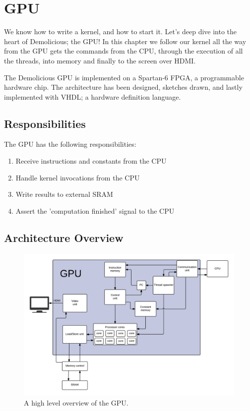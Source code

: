 \documentclass[../main/report.tex]{subfiles}
\begin{document}
\chapter{GPU}

We know how to write a kernel, and how to start it.
Let's deep dive into the heart of Demolicious; the GPU!
In this chapter we follow our kernel all the way from the GPU gets the commands from the CPU,
through the execution of all the threads, into memory and finally to the screen over HDMI.

The Demolicious GPU is implemented on a Spartan-6 FPGA, a programmable hardware chip.
The architecture has been designed, sketches drawn, and lastly implemented with VHDL;
a hardware definition language.

\section{Responsibilities}

The GPU has the following responsibilities:
\begin{enumerate}
  \item
    Receive instructions and constants from the CPU
  \item
    Handle kernel invocations from the CPU
  \item
    Write results to external SRAM
  \item
    Assert the 'computation finished' signal to the CPU
\end{enumerate}

\section{Architecture Overview}
\begin{figure}[H]
\centering
\includegraphics[width=\textwidth]{../gpu/diagrams/architecture_overview.png}
\caption{A high level overview of the GPU.}
\label{fig:architecture_overview}
\end{figure}
\end{document}
